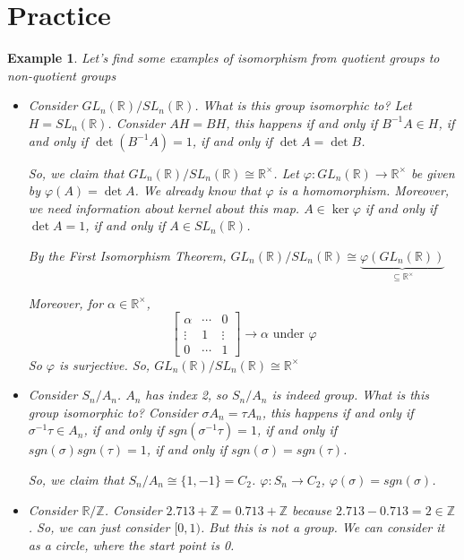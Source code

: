 \documentclass[twoside]{article}
\newtheorem{protoexample}[prototheorem]{Example}
\newenvironment{example}
{\colorlet{shadecolor}{red!15}\begin{shaded}\begin{protoexample}\normalfont}
		{\end{protoexample}\end{shaded}}
\begin{document}
\section{Practice}
\begin{example}
	Let's find some examples of isomorphism from quotient groups to non-quotient groups
	\begin{itemize}
		\item Consider $GL_n(\mathbb{R}) / SL_n(\mathbb{R})$. What is this group isomorphic to? Let $H = SL_n(\mathbb{R})$. Consider $AH = BH$, this happens if and only if $B^{-1}A \in H$, if and only if $\det(B^{-1}A) = 1$, if and only if $\det A = \det B$.

		      So, we claim that $GL_n(\mathbb{R}) / SL_n(\mathbb{R}) \cong \mathbb{R}^\times$. Let $\varphi: GL_n(\mathbb{R}) \rightarrow \mathbb{R}^\times$ be given by $\varphi(A) = \det A$. We already know that $\varphi$ is a homomorphism. Moreover, we need information about kernel about this map. $A \in \ker \varphi$ if and only if $\det A  = 1$, if and only if $A \in SL_n(\mathbb{R})$.

		      By the First Isomorphism Theorem, $GL_n(\mathbb{R}) / SL_n(\mathbb{R}) \cong \underbrace{\varphi(GL_n(\mathbb{R}))}_{\subseteq \mathbb{R}^\times}$

		      Moreover, for $\alpha \in \mathbb{R}^\times$, $$\begin{bmatrix}
				      \alpha & \cdots & 0      \\
				      \vdots & 1      & \vdots \\
				      0      & \cdots & 1
			      \end{bmatrix} \rightarrow \alpha \text{ under }\varphi$$ So $\varphi$ is surjective. So, $GL_n(\mathbb{R}) / SL_n(\mathbb{R}) \cong \mathbb{R}^\times$
		\item Consider $S_n / A_n$. $A_n$ has index 2, so $S_n / A_n$ is indeed group. What is this group isomorphic to? Consider $\sigma A_n = \tau A_n$, this happens if and only if $\sigma^{-1}\tau \in A_n$, if and only if $sgn(\sigma^{-1}\tau) = 1$, if and only if $sgn(\sigma)sgn(\tau) = 1$, if and only if $sgn(\sigma) = sgn(\tau)$.

		      So, we claim that $S_n / A_n \cong \{1, -1\} = C_2$. $\varphi: S_n \rightarrow C_2$, $\varphi(\sigma) = sgn(\sigma)$.

		\item Consider $\mathbb{R}/ \mathbb{Z}$. Consider $2.713 + \mathbb{Z} = 0.713 + \mathbb{Z}$ because $2.713 - 0.713 = 2 \in \mathbb{Z}$. So, we can just consider $[0, 1)$. But this is not a group. We can consider it as a circle, where the start point is 0.


\end{itemize}
\end{example}
\end{document}
